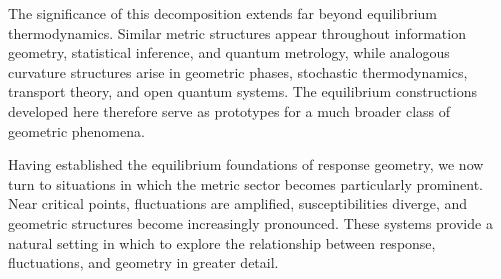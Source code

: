 The significance of this decomposition extends far beyond equilibrium thermodynamics. Similar metric structures appear throughout information geometry, statistical inference, and quantum metrology, while analogous curvature structures arise in geometric phases, stochastic thermodynamics, transport theory, and open quantum systems. The equilibrium constructions developed here therefore serve as prototypes for a much broader class of geometric phenomena.

Having established the equilibrium foundations of response geometry, we now turn to situations in which the metric sector becomes particularly prominent. Near critical points, fluctuations are amplified, susceptibilities diverge, and geometric structures become increasingly pronounced. These systems provide a natural setting in which to explore the relationship between response, fluctuations, and geometry in greater detail.
